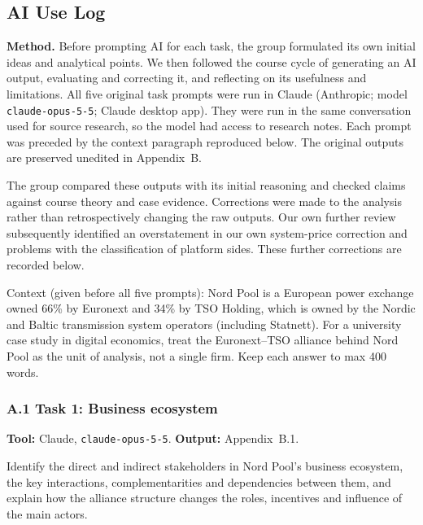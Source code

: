 \subsection{AI Use Log}
\label{app:A}

\textbf{Method.} Before prompting AI for each task, the group
formulated its own initial ideas and analytical points.
We then followed the course cycle of generating an AI output,
evaluating and correcting it, and reflecting on its usefulness
and limitations. All five original task prompts were run in
Claude (Anthropic; model \texttt{claude-opus-5-5};
Claude desktop app).
They were run in the same conversation used for source research,
so the model had access to research notes.
Each prompt was preceded by the context paragraph reproduced below.
The original outputs are preserved unedited in Appendix~B.

The group compared these outputs with its initial reasoning
and checked claims against course theory and case evidence.
Corrections were made to the analysis rather than retrospectively
changing the raw outputs. Our own further review
subsequently identified an overstatement in our own system-price
correction and problems with the classification of platform sides.
These further corrections are recorded below.

\begin{promptbox}
Context (given before all five prompts): Nord Pool is a European
power exchange owned 66\% by Euronext and 34\% by TSO Holding,
which is owned by the Nordic and Baltic transmission system
operators (including Statnett). For a university case study
in digital economics, treat the Euronext--TSO alliance behind
Nord Pool as the unit of analysis, not a single firm.
Keep each answer to max 400 words.
\end{promptbox}

\subsubsection*{A.1 Task 1: Business ecosystem}

\textbf{Tool:} Claude, \texttt{claude-opus-5-5}.
\quad \textbf{Output:} Appendix~B.1.

\begin{promptbox}
Identify the direct and indirect stakeholders in Nord Pool's
business ecosystem, the key interactions, complementarities
and dependencies between them, and explain how the alliance
structure changes the roles, incentives and influence
of the main actors.
\end{promptbox}

